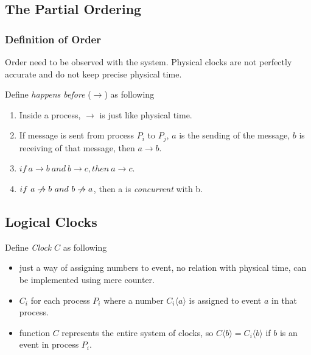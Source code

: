 \documentclass[12pt,a4paper,oneside]{article}
\begin{document}
\subsection{The Partial Ordering} \label{PO}

\subsubsection{Definition of Order} \label{s:PO:DO}

Order need to be observed with the system.
Physical clocks are not perfectly accurate and do not keep precise physical time\cite{l}.

\medskip

Define \textit{happens before} ($\rightarrow$) as following

\begin{enumerate}
  \item \label{PO1} Inside a process, $\rightarrow$ is just like physical time.
  \item \label{PO2} If message is sent from process $P_i$ to $P_j$,
  $a$ is the sending of the message,  $b$ is receiving of that message, then $a \rightarrow b$.
  \item $if\ a \rightarrow b\ and\ b \rightarrow c, then\ a \rightarrow c$.
  \item $if\ a \centernot\rightarrow b\ and\ b \centernot\rightarrow a$, then a is \textit{concurrent} with b.
\end{enumerate}

\subsection{Logical Clocks} \label{LC}

Define \textit{Clock} $C$ as following\cite{l}

\begin{itemize}
  \item just a way of assigning numbers to event, no relation with physical time, can be implemented using mere counter.
  \item $C_i$ for each process $P_i$ where a number $C_i\langle a \rangle$ is assigned to event $a$ in that process.
  \item function $C$ represents the entire system of clocks, so $C\langle b \rangle = C_i \langle b \rangle$ if $b$ is an event in process $P_i$.
\end{itemize}
\end{document}
